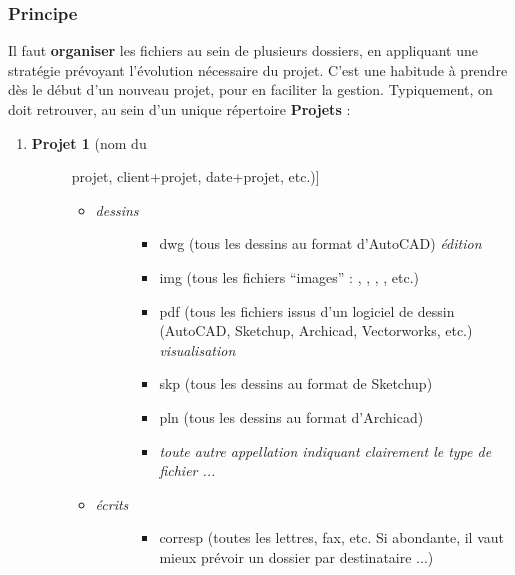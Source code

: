 \documentclass[a4paper,12pt,french]{sphinxmanual}
\begin{document}
\subsubsection{Principe}
\label{init_su+acad/demarrage:principe}
Il faut \textbf{organiser} les fichiers au sein de plusieurs dossiers, en appliquant
une stratégie prévoyant l'évolution nécessaire du projet. C'est une habitude à
prendre dès le début d'un nouveau projet, pour en faciliter la gestion.
Typiquement, on doit retrouver, au sein d'un unique répertoire \textbf{Projets} :
\begin{enumerate}
\item {} \begin{description}
\item[{\textbf{Projet 1} (nom du}] \leavevmode{[}projet, client+projet, date+projet, etc.){]}\begin{itemize}
\item {} \begin{description}
\item[{\emph{dessins}}] \leavevmode\begin{itemize}
\item {} 
dwg (tous les dessins au format   d'AutoCAD) \emph{édition}

\item {} 
img (tous les fichiers ``images'' : , , , , etc.)

\item {} 
pdf (tous les fichiers  issus d'un logiciel de dessin (AutoCAD, Sketchup, Archicad, Vectorworks, etc.) \emph{visualisation}

\item {} 
skp (tous les dessins au format  de Sketchup)

\item {} 
pln (tous les dessins au format  d'Archicad)

\item {} 
\emph{toute autre appellation indiquant clairement le type de fichier ...}

\end{itemize}

\end{description}

\item {} \begin{description}
\item[{\emph{écrits}}] \leavevmode\begin{itemize}
\item {} 
corresp (toutes les lettres, fax, etc. Si abondante, il vaut mieux prévoir un dossier par destinataire ...)


\end{itemize}
\end{description}
\end{itemize}
\end{description}
\end{enumerate}
\end{document}
